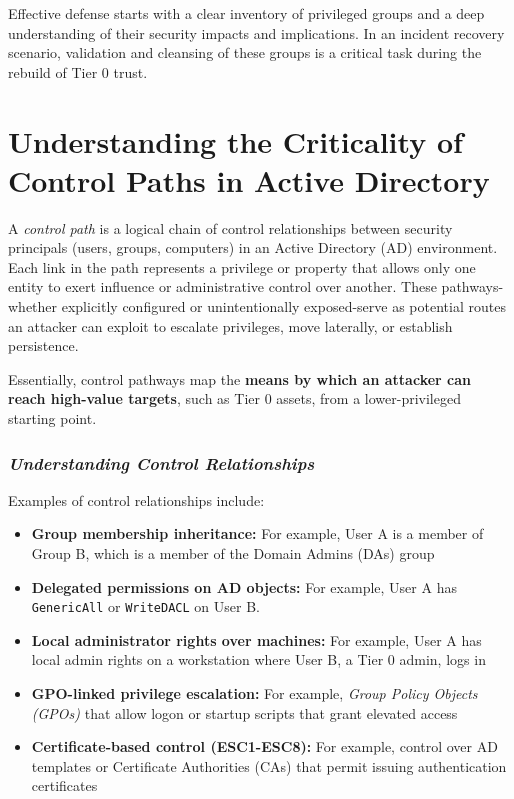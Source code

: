 Effective defense starts with a clear inventory of privileged groups and a deep understanding of their security impacts and implications. In an incident recovery scenario, validation and cleansing of these groups is a critical task during the rebuild of Tier 0 trust.

\section{Understanding the Criticality of Control Paths in Active Directory}
A \textit{control path} is a logical chain of control relationships between security principals (users, groups, computers) in an Active Directory (AD) environment. Each link in the path represents a privilege or property that allows only one entity to exert influence or administrative control over another. These pathways-whether explicitly configured or unintentionally exposed-serve as potential routes an attacker can exploit to escalate privileges, move laterally, or establish persistence.

Essentially, control pathways map the \textbf{means by which an attacker can reach high-value targets}, such as Tier 0 assets, from a lower-privileged starting point.

\subsubsection{\textit{Understanding Control Relationships}}
Examples of control relationships include:
\begin{itemize}
    \item \textbf{Group membership inheritance:} For example, User A is a member of Group B, which is a member of the Domain Admins (DAs) group
    \item \textbf{Delegated permissions on AD objects:} For example, User A has \texttt{GenericAll} or \texttt{WriteDACL} on User B.
        \item \textbf{Local administrator rights over machines:} For example, User A has local admin rights on a workstation where User B, a Tier 0 admin, logs in
        \item \textbf{GPO-linked privilege escalation:} For example, \textit{Group Policy Objects (GPOs)} that allow logon or startup scripts that grant elevated access
        \item \textbf{Certificate-based control (ESC1-ESC8):}  For example, control over AD templates or Certificate Authorities (CAs) that permit issuing authentication certificates
        \end{itemize}

